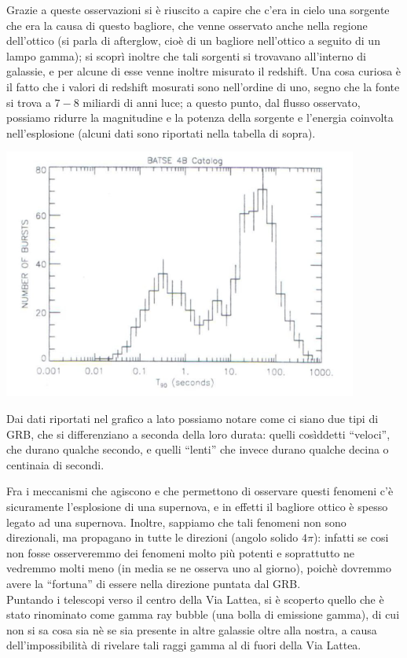 Grazie a queste osservazioni si è riuscito a capire che c'era in cielo una sorgente che era la causa di questo bagliore, che venne osservato anche nella regione dell'ottico (si parla di afterglow, cioè di un bagliore nell'ottico a seguito di un lampo gamma); si scoprì inoltre che tali sorgenti si trovavano all'interno di galassie, e per alcune di esse venne inoltre misurato il redshift. Una cosa curiosa è il fatto che i valori di redshift mosurati sono nell'ordine di  uno, segno che la fonte si trova a $7-8$ miliardi di anni luce; a questo punto, dal flusso osservato, possiamo ridurre la magnitudine e la potenza della sorgente e l'energia coinvolta nell'esplosione (alcuni dati sono riportati nella tabella di sopra).
\\
\begin{minipage}{.45\textwidth}
	\centering
	\includegraphics[width=0.875\textwidth]{Img/bertin_14bis.png}
\end{minipage}
\begin{minipage}{.50\textwidth}
Dai dati riportati nel grafico a lato possiamo notare come ci siano due tipi di GRB, che si differenziano a seconda della loro durata: quelli cosìddetti ``veloci'', che durano qualche secondo, e quelli ``lenti'' che invece durano qualche decina o centinaia di secondi.
\end{minipage}

Fra i meccanismi che agiscono e che permettono di osservare questi fenomeni c'è sicuramente l'esplosione di una supernova, e in effetti il bagliore ottico è spesso legato ad una supernova. Inoltre, sappiamo che tali fenomeni non sono direzionali, ma propagano in tutte le direzioni (angolo solido $4 \pi$): infatti se cosi non fosse osserveremmo dei fenomeni molto più potenti e soprattutto ne vedremmo molti meno (in media se ne osserva uno al giorno), poichè dovremmo avere la ``fortuna'' di essere nella direzione puntata dal GRB.
\\
Puntando i telescopi verso il centro della Via Lattea, si è scoperto quello che è stato rinominato come gamma ray bubble (una bolla di emissione gamma), di cui non si sa cosa sia nè se sia presente in altre galassie oltre alla nostra, a causa dell'impossibilità di rivelare tali raggi gamma al di fuori della Via Lattea.
\\


